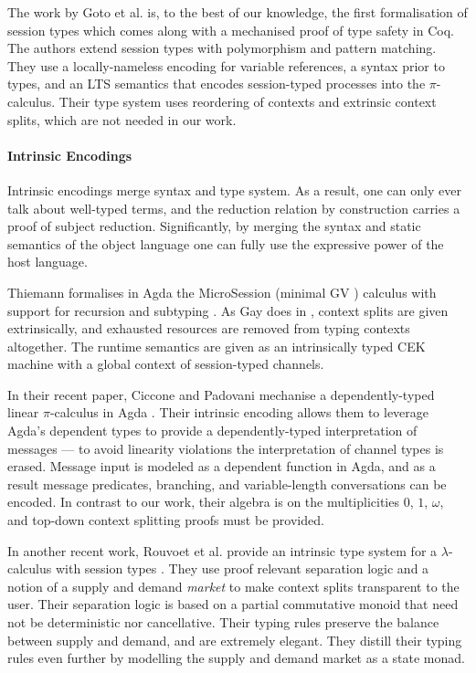 \documentclass[]{llncs}
\newcommand{\lambdacalc}{$\lambda$-calculus}
\newcommand{\picalc}{$\pi$-calculus}
\begin{document}
The work by Goto et al. \cite{Goto2016a} is, to the best of our knowledge, the first formalisation of session types which comes along with a mechanised proof of type safety in Coq.
The authors extend session types with polymorphism and pattern matching.
They use a locally-nameless encoding for variable references, a syntax prior to types, and an LTS semantics that encodes session-typed processes into the \picalc{}.
Their type system uses reordering of contexts and extrinsic context splits, which are not needed in our work. 

\paragraph*{Intrinsic Encodings}
 
Intrinsic encodings merge syntax and type system.
As a result, one can only ever talk about well-typed terms, and the reduction relation by construction carries a proof of subject reduction.
Significantly, by merging the syntax and static semantics of the object language one can fully use the expressive power of the host language.

Thiemann formalises in Agda the MicroSession (minimal GV \cite{Gay2010}) calculus with support for recursion and subtyping \cite{Thiemann2019}.
As Gay does in \cite{Gay2001}, context splits are given extrinsically, and exhausted resources are removed from typing contexts altogether.
The runtime semantics are given as an intrinsically typed CEK machine with a global context of session-typed channels.

In their recent paper, Ciccone and Padovani mechanise a dependently-typed linear \picalc{} in Agda \cite{Ciccone}.
Their intrinsic encoding allows them to leverage Agda's dependent types to provide a dependently-typed interpretation of messages --- to avoid linearity violations the interpretation of channel types is erased.
Message input is modeled as a dependent function in Agda, and as a result message predicates, branching, and variable-length conversations can be encoded.
In contrast to our work, their algebra is on the multiplicities $0$, $1$, $\omega$, and top-down context splitting proofs must be provided.

In another recent work, Rouvoet et al. provide an intrinsic type system for a \lambdacalc{} with session types \cite{Rouvoet2020}.
They use proof relevant separation logic and a notion of a supply and demand \emph{market} to make context splits transparent to the user.
Their separation logic is based on a partial commutative monoid that need not be deterministic nor cancellative.
Their typing rules preserve the balance between supply and demand, and are extremely elegant.
They distill their typing rules even further by modelling the supply and demand market as a state monad.
\end{document}

